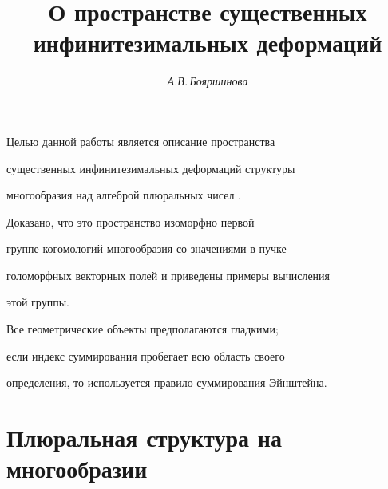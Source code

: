 \author{\it А.В.\,Бояршинова}


\title{О пространстве существенных \\


инфинитезимальных деформаций}


 




\date{} 




 


\pagestyle{plain} %


 


 




 


\maketitle 


 





Целью данной работы является описание пространства


существенных инфинитезимальных деформаций структуры


многообразия над алгеброй плюральных чисел \cite{Vish}.


Доказано, что это пространство изоморфно первой


группе когомологий многообразия со значениями в пучке


голоморфных векторных полей и приведены примеры вычисления


этой группы.





Все геометрические объекты предполагаются гладкими;


если индекс суммирования пробегает всю область своего


определения, то используется правило суммирования Эйнштейна.





\section{Плюральная структура на многообразии}





